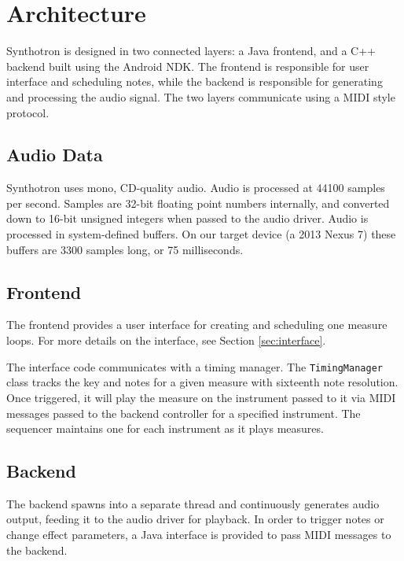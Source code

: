 \documentclass[letterpaper,12pt]{article}
\begin{document}
\section{Architecture}

Synthotron is designed in two connected layers: a Java frontend, and a C++ backend built using the Android NDK. The frontend is responsible for user interface and scheduling notes, while the backend is responsible for generating and processing the audio signal. The two layers communicate using a MIDI style protocol.

\subsection{Audio Data}

Synthotron uses mono, CD-quality audio. Audio is processed at 44100 samples per second. Samples are 32-bit floating point numbers internally, and converted down to 16-bit unsigned integers when passed to the audio driver. Audio is processed in system-defined buffers. On our target device (a 2013 Nexus 7) these buffers are 3300 samples long, or 75 milliseconds.

\subsection{Frontend}

The frontend provides a user interface for creating and scheduling one measure loops. For more details on the interface, see Section \ref{sec:interface}.

The interface code communicates with a timing manager. The \texttt{TimingManager} class tracks the key and notes for a given measure with sixteenth note resolution. Once triggered, it will play the measure on the instrument passed to it via MIDI messages passed to the backend controller for a specified instrument. The sequencer maintains one for each instrument as it plays measures.

\subsection{Backend}

The backend spawns into a separate thread and continuously generates audio output, feeding it to the audio driver for playback. In order to trigger notes or change effect parameters, a Java interface is provided to pass MIDI messages to the backend.
\end{document}
